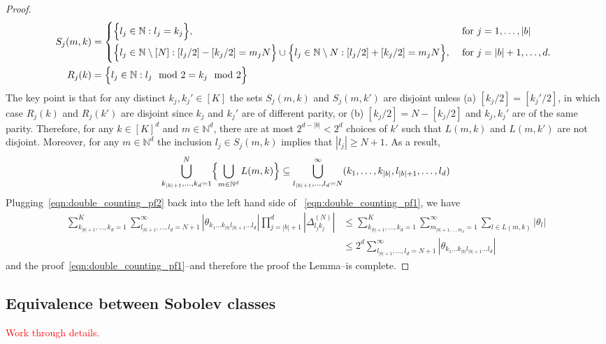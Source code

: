\documentclass{article}
\newcommand{\abs}[1]{\left \lvert #1 \right \rvert}
\newcommand{\1}{\mathbf{1}}
\theoremstyle{alden}
\theoremstyle{aldenthm}
\theoremstyle{definition}
\theoremstyle{remark}
\begin{document}
\begin{proof}
	\begin{align*}
	S_j(m,k) & = 
	\begin{cases*}
	\Bigl\{l_j \in \mathbb{N}: l_j = k_j\Bigr\}, & ~\textrm{for $j = 1,\ldots,\abs{b}$} \\
	\Bigl\{l_j \in \mathbb{N} \setminus [N]: [l_j/2] - [k_j/2] = m_j N \Bigr\} \cup \Bigl\{l_j \in \mathbb{N} \setminus{N}: [l_j/2] + [k_j/2] = m_j N \Bigr\}, & ~\textrm{for $j = \abs{b} + 1,\ldots,d$}.
	\end{cases*} \\
	R_j(k) & = \Bigl\{l_j \in \mathbb{N}: l_j \mod 2 = k_j \mod 2\Bigr\}
	\end{align*}
	The key point is that for any distinct $k_j,k_j' \in [K]$ the sets $S_j(m,k)$ and $S_j(m,k')$ are disjoint unless (a) $[k_j/2] = [k_j'/2]$, in which case $R_j(k)$ and $R_j(k')$ are disjoint since $k_j$ and $k_j'$ are of different parity, or (b) $[k_j/2] = N - [k_j/2]$ and $k_j,k_j'$ are of the same parity. Therefore, for any $k \in [K]^d$ and $m \in \mathbb{N}^d$, there are at most $2^{d - \abs{b}} < 2^d$ choices of $k'$ such that $L(m,k)$ and $L(m,k')$ are not disjoint. Moreover, for any $m \in \mathbb{N}^d$ the inclusion $l_j \in S_j(m,k)$ implies that $\abs{l_j} \geq N + 1$. As a result,
	\begin{equation*}
	\bigcup_{k_{\abs{b} + 1},\ldots,k_d = 1}^{N}\Bigl\{\bigcup_{m \in \mathbb{N}^d} L(m,k)\Bigr\} \subseteq \bigcup_{l_{\abs{b} + 1},\ldots, l_{d} = N}^{\infty} (k_1,\ldots,k_{\abs{b}},l_{\abs{b} + 1},\ldots,l_d)
	\end{equation*} Plugging~\eqref{eqn:double_counting_pf2} back into the left hand side of~ \eqref{eqn:double_counting_pf1}, we have
	\begin{align*}
	\sum_{k_{\abs{b} + 1},\ldots,k_{d} = 1}^{K} \sum_{l_{\abs{b} + 1}, \ldots, l_d = N + 1}^{\infty} \abs{\theta_{k_1\ldots k_{\abs{b}} l_{\abs{b} + 1} \ldots l_d}} \prod_{j = \abs{b} + 1}^{d} \abs{\Delta_{l_jk_j}^{(N)}} & \leq \sum_{k_{\abs{b} + 1},\ldots,k_{d} = 1}^{K} \sum_{m_{\abs{b} + 1,\ldots, m_d} = 1}^{\infty} \sum_{l \in L(m,k)} \abs{\theta_l} \\
	& \leq 2^d \sum_{l_{\abs{b} + 1},\ldots,l_{d} = N + 1}^{\infty} \abs{\theta_{k_1\ldots k_{\abs{b}} l_{\abs{b} + 1} \ldots l_d}}
	\end{align*}
	and the proof~\eqref{eqn:double_counting_pf1}--and therefore the proof the Lemma--is complete.
\end{proof}

\subsection{Equivalence between Sobolev classes}
\label{subsec:sobolev_class_equivalence}

\textcolor{red}{Work through details.}
\end{document}
